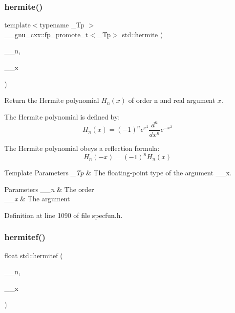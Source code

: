 \subsubsection{\texorpdfstring{hermite()}{hermite()}}
{\footnotesize\ttfamily template$<$typename \+\_\+\+Tp $>$ \\
\+\_\+\+\_\+gnu\+\_\+cxx\+::fp\+\_\+promote\+\_\+t$<$\+\_\+\+Tp$>$ std\+::hermite (\begin{DoxyParamCaption}\item[{unsigned int}]{\+\_\+\+\_\+n,  }\item[{\+\_\+\+Tp}]{\+\_\+\+\_\+x }\end{DoxyParamCaption})\hspace{0.3cm}{\ttfamily [inline]}}

Return the Hermite polynomial $ H_n(x) $ of order n and {\ttfamily real} argument $ x $.

The Hermite polynomial is defined by\+: \[ H_n(x) = (-1)^n e^{x^2} \frac{d^n}{dx^n} e^{-x^2} \]

The Hermite polynomial obeys a reflection formula\+: \[ H_n(-x) = (-1)^n H_n(x) \]


\begin{DoxyTemplParams}{Template Parameters}
{\em \+\_\+\+Tp} & The floating-\/point type of the argument {\ttfamily \+\_\+\+\_\+x}. \\
\hline
\end{DoxyTemplParams}

\begin{DoxyParams}{Parameters}
{\em \+\_\+\+\_\+n} & The order \\
\hline
{\em \+\_\+\+\_\+x} & The argument \\
\hline
\end{DoxyParams}


Definition at line 1090 of file specfun.\+h.

\mbox{\label{group__tr29124__math__spec__func_ga94dae7444bb349e33057a92932db8abe}} 
\subsubsection{\texorpdfstring{hermitef()}{hermitef()}}
{\footnotesize\ttfamily float std\+::hermitef (\begin{DoxyParamCaption}\item[{unsigned int}]{\+\_\+\+\_\+n,  }\item[{float}]{\+\_\+\+\_\+x }\end{DoxyParamCaption})\hspace{0.3cm}{\ttfamily [inline]}}

